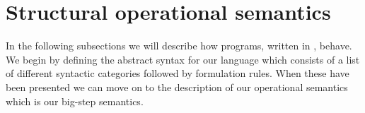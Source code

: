 \section{Structural operational semantics}
\label{sec:structuraloperationalsemantics}

In the following subsections we will describe how programs, written in
\productname{}, behave. We begin by defining the abstract syntax for our
language which consists of a list of different syntactic categories followed by
formulation rules. When these have been presented we can move on to the
description of our operational semantics which is our big-step
semantics.\cite[pg. 27]{tt-hh}
